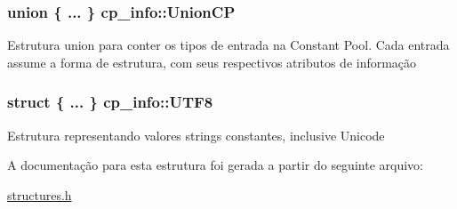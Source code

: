 \subsubsection[{\texorpdfstring{Union\+CP}{UnionCP}}]{\setlength{\rightskip}{0pt plus 5cm}union \{ ... \}  cp\+\_\+info\+::\+Union\+CP}\hypertarget{structcp__info_aad04019f28f2b6191ace6ab762e051a5}{}\label{structcp__info_aad04019f28f2b6191ace6ab762e051a5}
Estrutura union para conter os tipos de entrada na Constant Pool. Cada entrada assume a forma de estrutura, com seus respectivos atributos de informação 
\subsubsection[{\texorpdfstring{U\+T\+F8}{UTF8}}]{\setlength{\rightskip}{0pt plus 5cm}struct \{ ... \}   cp\+\_\+info\+::\+U\+T\+F8}\hypertarget{structcp__info_a3a9e08ded40cde605289d41a69978159}{}\label{structcp__info_a3a9e08ded40cde605289d41a69978159}
Estrutura representando valores strings constantes, inclusive Unicode 

A documentação para esta estrutura foi gerada a partir do seguinte arquivo\+:\begin{DoxyCompactItemize}
\item 
\hyperlink{structures_8h}{structures.\+h}\end{DoxyCompactItemize}

